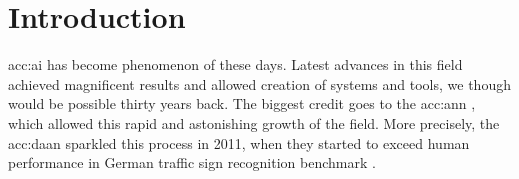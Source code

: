 \chapter{Introduction}

\acrfull{acc:ai} 
has become phenomenon of these days. Latest advances in this field achieved magnificent results and allowed creation of systems and tools, we though would be possible thirty years back. The biggest credit goes to the \acrfull{acc:ann}
, which allowed this rapid and astonishing growth of the field. More precisely, the \acrfull{acc:daan} 
sparkled this process in 2011, when they started to exceed human performance in German traffic sign recognition benchmark \cite{CIRESAN2012333}.